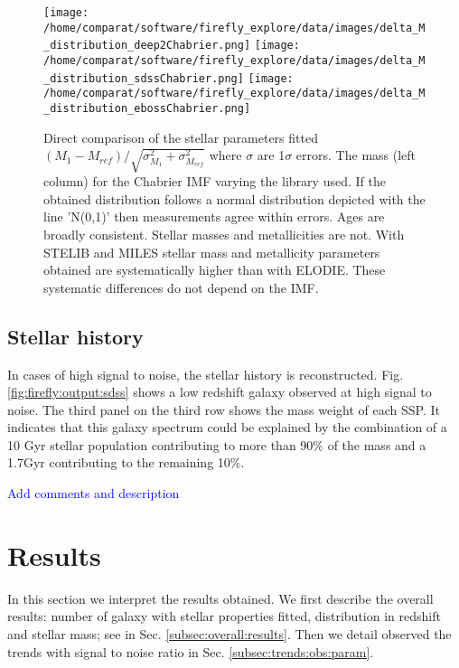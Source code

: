 \documentclass[onecolumn]{aa}
\begin{document}
\begin{figure}
\begin{center}
\caption{\label{fig:distributions:MwM} 
Direct comparison of the stellar parameters fitted $(M_1-M_{ref})/\sqrt{\sigma^2_{M_1}+\sigma^2_{M_{ref}}}$ where $\sigma$ are 1$\sigma$ errors. The mass (left column) for the Chabrier IMF varying the library used. 
If the obtained distribution follows a normal distribution depicted with the line 'N(0,1)' then measurements agree within errors. 
Ages are broadly consistent. 
Stellar masses and metallicities are not. 
With STELIB and MILES stellar mass and metallicity parameters obtained are systematically higher than with ELODIE. 
These systematic differences do not depend on the IMF.}  
\texttt{[image: /home/comparat/software/firefly\_explore/data/images/delta\_M\_distribution\_deep2Chabrier.png]}
\hspace*{-0.5cm}
\texttt{[image: /home/comparat/software/firefly\_explore/data/images/delta\_M\_distribution\_sdssChabrier.png]}
\hspace*{-0.5cm}
\texttt{[image: /home/comparat/software/firefly\_explore/data/images/delta\_M\_distribution\_ebossChabrier.png]}
\end{center}
\end{figure}

\subsection{Stellar history}
\label{subsec:history}
In cases of high signal to noise, the stellar history is reconstructed. Fig. \ref{fig:firefly:output:sdss} shows a low redshift galaxy observed at high signal to noise. 
The third panel on the third row shows the mass weight of each SSP. 
It indicates that this galaxy spectrum could be explained by the combination of a 10 Gyr stellar population contributing to more than 90\% of the mass and a 1.7Gyr contributing to the remaining 10\%.

\textcolor{blue}{Add comments and description}


\clearpage
\section{Results}
\label{sec:results}
In this section we interpret the results obtained.
We first describe the overall results: number of galaxy with stellar properties fitted, distribution in redshift and stellar mass; see in Sec. \ref{subsec:overall:results}. 
Then we detail observed the trends with signal to noise ratio in Sec. \ref{subsec:trends:obs:param}. 
\end{document}
